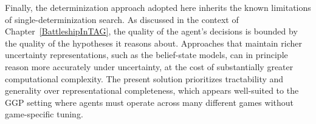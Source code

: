 Finally, the determinization approach adopted here inherits the known limitations of single-determinization search. As discussed in the context of Chapter~\ref{BattleshipInTAG}, the quality of the agent's decisions is bounded by the quality of the hypotheses it reasons about. Approaches that maintain richer uncertainty representations, such as the belief-state models\cite{morenville2025belief_constraints,morenville2024beliefsg}, can in principle reason more accurately under uncertainty, at the cost of substantially greater computational complexity. The present solution prioritizes tractability and generality over representational completeness, which appears well-suited to the GGP setting where agents must operate across many different games without game-specific tuning.
